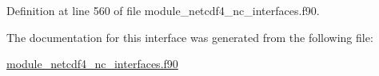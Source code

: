 Definition at line 560 of file module\+\_\+netcdf4\+\_\+nc\+\_\+interfaces.\+f90.



The documentation for this interface was generated from the following file\+:\begin{DoxyCompactItemize}
\item 
\hyperlink{module__netcdf4__nc__interfaces_8f90}{module\+\_\+netcdf4\+\_\+nc\+\_\+interfaces.\+f90}\end{DoxyCompactItemize}
